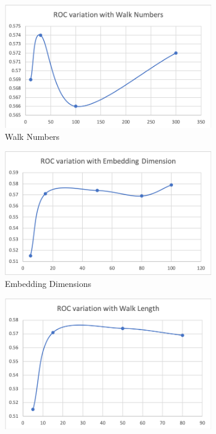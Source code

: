 \documentclass[sigconf]{acmart}
\begin{document}
\begin{figure}[h]
  \centering
  \begin{subfigure}[b]{0.49\linewidth}
    \includegraphics[width=\linewidth]{Images/Picture 1.png}
    \caption{Walk Numbers}
  \end{subfigure}
  \begin{subfigure}[b]{0.49\linewidth}
    \includegraphics[width=\linewidth]{Images/Picture 2.png}
    \caption{Embedding Dimensions}
  \end{subfigure}
  \begin{subfigure}[b]{0.49\linewidth}
    \includegraphics[width=\linewidth]{Images/Picture 3.png}

\end{subfigure}
\end{figure}
\end{document}
